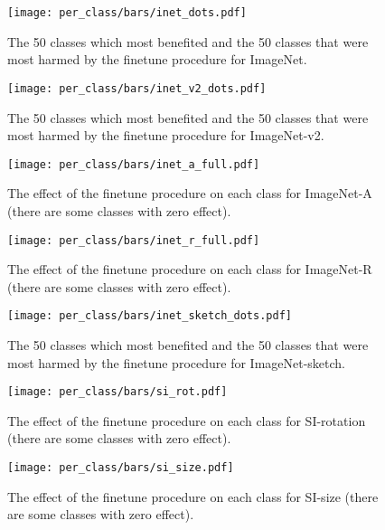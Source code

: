 \documentclass{article}
\begin{document}
\begin{figure}[!htb]
    \centering
    \texttt{[image: per\_class/bars/inet\_dots.pdf]}
    \caption{The 50 classes which most benefited and the 50 classes that were most harmed by the finetune procedure for ImageNet.}
    \label{fig:bar-val}
\end{figure}
\begin{figure}[!htb]
    \centering
    \texttt{[image: per\_class/bars/inet\_v2\_dots.pdf]}
    \caption{The 50 classes which most benefited and the 50 classes that were most harmed by the finetune procedure for ImageNet-v2.}
    \label{fig:bar-v2}
\end{figure}
\begin{figure}[!htb]
    \centering
    \texttt{[image: per\_class/bars/inet\_a\_full.pdf]}
    \caption{The effect of the finetune procedure on each class for ImageNet-A (there are some classes with zero effect).}
    \label{fig:bar-a}
\end{figure}
\begin{figure}[!htb]
    \centering
    \texttt{[image: per\_class/bars/inet\_r\_full.pdf]}
    \caption{The effect of the finetune procedure on each class for ImageNet-R (there are some classes with zero effect).}
    \label{fig:bar-r}
\end{figure}
\begin{figure}[!htb]
    \centering
    \texttt{[image: per\_class/bars/inet\_sketch\_dots.pdf]}
    \caption{The 50 classes which most benefited and the 50 classes that were most harmed by the finetune procedure for ImageNet-sketch.}
    \label{fig:bar-sketch}
\end{figure}
\begin{figure}[!htb]
    \centering
    \texttt{[image: per\_class/bars/si\_rot.pdf]}
    \caption{The effect of the finetune procedure on each class for SI-rotation (there are some classes with zero effect).}
    \label{fig:bar-rot}
\end{figure}
\begin{figure}[!htb]
    \centering
    \texttt{[image: per\_class/bars/si\_size.pdf]}
    \caption{The effect of the finetune procedure on each class for SI-size (there are some classes with zero effect).}
    \label{fig:bar-size}
\end{figure}
\end{document}

